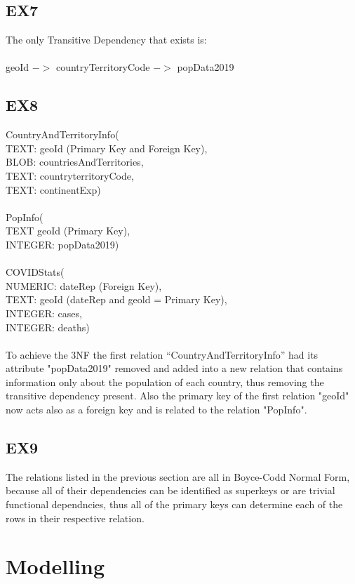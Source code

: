 \documentclass{report}
\begin{document}
\subsection{EX7}
The only Transitive Dependency that exists is: \\ \\
geoId $->$ countryTerritoryCode $->$ popData2019

\subsection{EX8}
CountryAndTerritoryInfo(\\TEXT: geoId (Primary Key and Foreign Key),\\  BLOB: countriesAndTerritories,\\ TEXT: countryterritoryCode,\\  TEXT: continentExp) \\ \\
PopInfo(\\TEXT geoId (Primary Key),\\ INTEGER: popData2019) \\ \\
COVIDStats(\\NUMERIC: dateRep (Foreign Key),\\ TEXT: geoId (dateRep and geold = Primary Key),\\ INTEGER: cases,\\ INTEGER: deaths) \\ \\

To achieve the 3NF the first relation “CountryAndTerritoryInfo” had its attribute "popData2019" removed and added into a new relation that contains information only about the population of each country, thus removing the transitive dependency present. Also the primary key of the first relation "geoId" now acts also as a foreign key and is related to the relation "PopInfo". 

\subsection{EX9}
The relations listed in the previous section are all in Boyce-Codd Normal Form, because all of their dependencies can be identified as superkeys or are trivial functional dependncies, thus all of the primary keys can determine each of the rows in their respective relation.

\section{Modelling}
\end{document}
